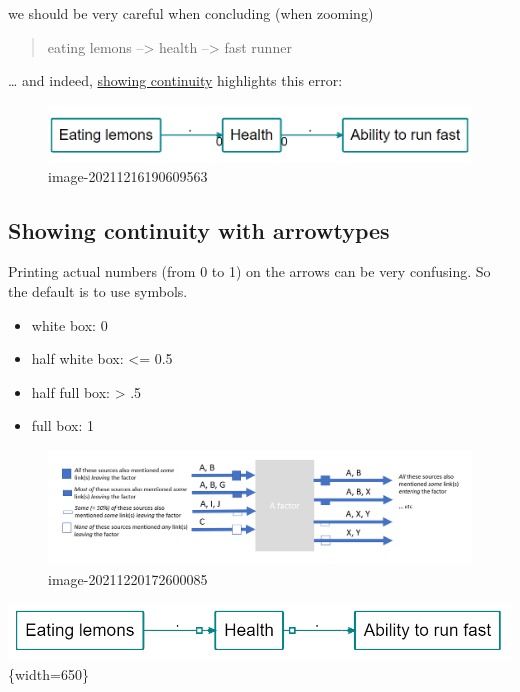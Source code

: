 \documentclass[
]{book}
\providecommand{\tightlist}{%
  \setlength{\itemsep}{0pt}\setlength{\parskip}{0pt}}
\begin{document}
we should be very careful when concluding (when zooming)

\begin{quote}
eating lemons --\textgreater{} health --\textgreater{} fast runner
\end{quote}

\ldots{} and indeed, \href{https://causalmap.shinyapps.io/CM2test/?s=416}{showing continuity} highlights this error:

\begin{figure}
\centering
\includegraphics[width=6.77083in,height=\textheight]{_assets/image-20211216190609563.png}
\caption{image-20211216190609563}
\end{figure}

\hypertarget{showing-continuity-with-arrowtypes}{%
\subsection{Showing continuity with arrowtypes}\label{showing-continuity-with-arrowtypes}}

Printing actual numbers (from 0 to 1) on the arrows can be very confusing. So the default is to use symbols.

\begin{itemize}
\tightlist
\item
  white box: 0
\item
  half white box: \textless= 0.5
\item
  half full box: \textgreater{} .5
\item
  full box: 1
\end{itemize}

\begin{figure}
\centering
\includegraphics[width=6.77083in,height=\textheight]{_assets/image-20211220172600085.png}
\caption{image-20211220172600085}
\end{figure}

\includegraphics[width=6.77083in,height=\textheight]{_assets/image-20211220171759409.png}\{width=650\}
\end{document}
